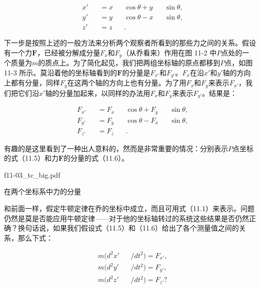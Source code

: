 \documentclass[12pt,oneside]{book}
\begin{document}
\begin{equation}
\begin{alignedat}{4}
&x'&&=x&&\cos\theta+y&&\sin\theta,\\
&y'&&=y&&\cos\theta-x&&\sin\theta,\\
&z'&&=z&&.
\end{alignedat}
\label{Eq:I:11:5}
\end{equation}


下一步是按照上述的一般方法来分析两个观察者所看到的那些力之间的关系。假设有一个力$\boldsymbol{F}$，已经被分解成分量$F_x$和$F_y$（从乔看来）作用在图 11-2 中$P$点处的一个质量为$m$的质点上。为了简化起见，我们把两组坐标轴的原点都移到$P$点，如图 11-3 所示。莫沿着他的坐标轴看到的$\boldsymbol{F}$的分量是$F_{x'}$和$F_{y'}$。$F_x$在沿$x'$和$y'$轴的方向上都有分量，同样$F_y$在这两个轴的方向上也有分量。为了用$F_x$和$F_y$来表示$F_{x'}$，我们把它们沿$x'$轴的分量加起来，以同样的办法用$F_x$和$F_y$来表示$F_{y'}$。结果是：

\begin{equation}
\begin{alignedat}{4}
&F_{x'}&&=F_x&&\cos\theta+F_y&&\sin\theta,\\
&F_{y'}&&=F_y&&\cos\theta-F_x&&\sin\theta,\\
&F_{z'}&&=F_z&&.
\end{alignedat}
\label{Eq:I:11:6}
\end{equation}

有趣的是这里看到了一种出人意料的，然而是非常重要的情况：分别表示$P$点坐标的式（11.5）和力$\boldsymbol{F}$的分量的式（11.6）。

\begin{fig}{f11-03_tc_big.pdf}
\caption{在两个坐标系中力的分量}
\label{fig:图11-3}
\end{fig}


和前面一样，假定牛顿定律在乔的坐标中成立，而且可用式（11.1）来表示。问题仍然是莫是否能应用牛顿定律——对于他的坐标轴转过的系统这些结果是否仍然正确？换句话说，如果我们假设式（11.5）和（11.6）给出了各个测量值之间的关系，那么下式：

\begin{equation}
\begin{alignedat}{2}
&m(d^2x'&&/dt^2)=F_{x'},\\
&m(d^2y'&&/dt^2)=F_{y'},\\
&m(d^2z'&&/dt^2)=F_{z'}?
\end{alignedat}
\label{Eq:I:11:7}
\end{equation}
\end{document}
